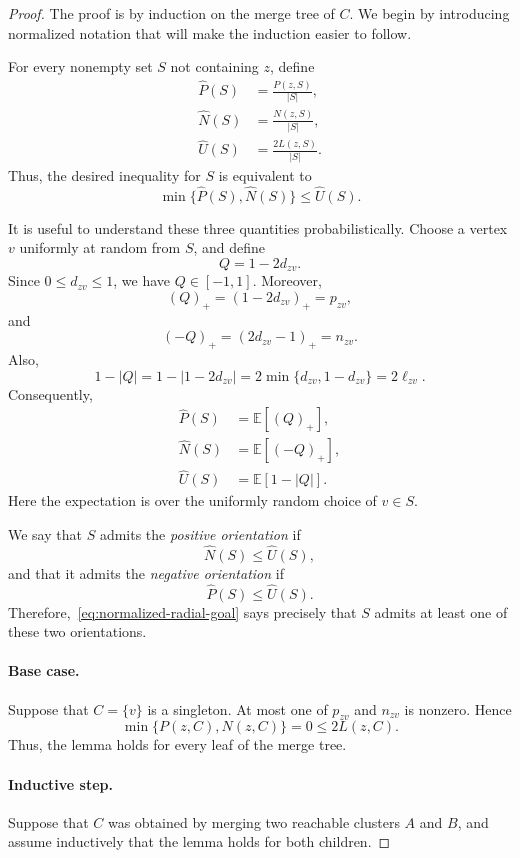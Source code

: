 \documentclass[11pt]{article}
\begin{document}
\begin{proof}
The proof is by induction on the merge tree of $C$.  We begin by introducing
normalized notation that will make the induction easier to follow.

For every nonempty set $S$ not containing $z$, define
\begin{align*}
    \widehat P(S)
    &=\frac{P(z,S)}{|S|},\\
    \widehat N(S)
    &=\frac{N(z,S)}{|S|},\\
    \widehat U(S)
    &=\frac{2L(z,S)}{|S|}.
\end{align*}
Thus, the desired inequality for $S$ is equivalent to
\begin{equation}
    \min\{\widehat P(S),\widehat N(S)\}
    \le \widehat U(S).
    \label{eq:normalized-radial-goal}
\end{equation}

It is useful to understand these three quantities probabilistically.  Choose
a vertex $v$ uniformly at random from $S$, and define
\[
    Q=1-2d_{zv}.
\]
Since $0\le d_{zv}\le 1$, we have $Q\in[-1,1]$.  Moreover,
\[
    (Q)_+=(1-2d_{zv})_+=p_{zv},
\]
and
\[
    (-Q)_+=(2d_{zv}-1)_+=n_{zv}.
\]
Also,
\[
    1-|Q|
    =1-|1-2d_{zv}|
    =2\min\{d_{zv},1-d_{zv}\}
    =2\ell_{zv}.
\]
Consequently,
\begin{align}
    \widehat P(S)&=\mathbb E[(Q)_+],\label{eq:normalized-P}\\
    \widehat N(S)&=\mathbb E[(-Q)_+],\label{eq:normalized-N}\\
    \widehat U(S)&=\mathbb E[1-|Q|].\label{eq:normalized-U}
\end{align}
Here the expectation is over the uniformly random choice of $v\in S$.

We say that $S$ admits the \emph{positive orientation} if
\[
    \widehat N(S)\le \widehat U(S),
\]
and that it admits the \emph{negative orientation} if
\[
    \widehat P(S)\le \widehat U(S).
\]
Therefore,~\eqref{eq:normalized-radial-goal} says precisely that $S$ admits
at least one of these two orientations.

\paragraph{Base case.}
Suppose that $C=\{v\}$ is a singleton.  At most one of
$p_{zv}$ and $n_{zv}$ is nonzero.  Hence
\[
    \min\{P(z,C),N(z,C)\}=0\le 2L(z,C).
\]
Thus, the lemma holds for every leaf of the merge tree.

\paragraph{Inductive step.}
Suppose that $C$ was obtained by merging two reachable clusters $A$ and
$B$, and assume inductively that the lemma holds for both children.


\end{proof}
\end{document}
